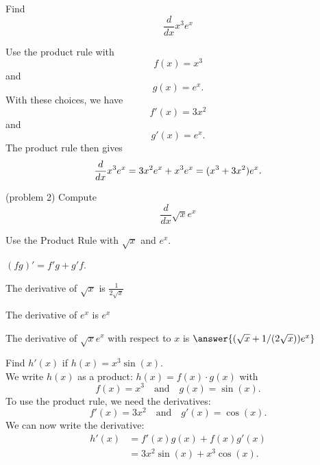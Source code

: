 \documentclass[handout]{ximera}
\begin{document}
\begin{example}[example 2]
Find 
\[
\frac{d}{dx} x^3e^x
\]

Use the product rule with 
\[
f(x) = x^3
\]
and
\[
g(x) = e^x.
\]
With these choices, we have
\[
f'(x) = 3x^2
\]
and 
\[
g'(x) = e^x.
\]
The product rule then gives
\[
\frac{d}{dx}x^3e^x = 3x^2e^x + x^3e^x\\
=(x^3 + 3x^2)e^x.
\]
\end{example}

\begin{problem}(problem 2)
  Compute
  \[
  \frac{d}{dx} \sqrt x e^x
  \]
  
    \begin{hint}
      Use the Product Rule with $\sqrt x$ and $e^x$.
    \end{hint}
    \begin{hint}
      $(fg)' = f'g+g'f$.
    \end{hint}
    \begin{hint}
      The derivative of $\sqrt x$ is $\frac{1}{2\sqrt x}$
    \end{hint}
    \begin{hint}
      The derivative of $e^x$ is $e^x$
    \end{hint}
    
		The derivative of $\sqrt x e^x$ with respect to $x$ is
		 $\answer{(\sqrt x + 1/(2\sqrt x))e^x}$
		
\end{problem}




\begin{example}[example 3]
Find $h'(x)$ if $h(x) = x^3\sin(x)$.\\
We write $h(x)$ as a product: $h(x) = f(x)\cdot g(x)$ with 
\[f(x) = x^3 \quad \text{and} \quad g(x) = \sin(x).\]
To use the product rule, we need the derivatives:
\[f'(x) = 3x^2 \quad \text{and} \quad g'(x) = \cos(x).\]
We can now write the derivative:
\begin{align*}
h'(x) &= f'(x)g(x) + f(x)g'(x) \\
&= 3x^2\sin(x) + x^3\cos(x).
\end{align*}
\end{example}

\begin{center}
\begin{foldable}
\end{foldable}
\end{center}
\end{document}
